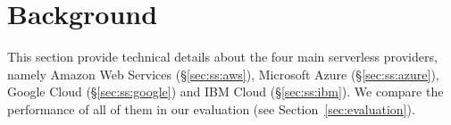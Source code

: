 \section{Background}
This section provide technical details about the four main serverless providers, namely Amazon Web Services (\S\ref{sec:ss:aws}), Microsoft Azure (\S\ref{sec:ss:azure}), Google Cloud (\S\ref{sec:ss:google}) and IBM Cloud (\S\ref{sec:ss:ibm}). 
 We compare the performance of all of them in our evaluation (see Section~\ref{sec:evaluation}).



